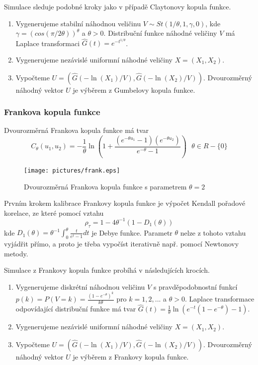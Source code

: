 Simulace sleduje podobné kroky jako v případě Claytonovy kopula funkce.
\begin{enumerate}
\item Vygenerujeme stabilní náhodnou veličinu $V \sim St(1 / \theta, 1, \gamma, 0)$, kde $\gamma = (cos(\pi/2\theta))^{\theta}$ a $\theta > 0$. Distribuční funkce náhodné veličiny $V$ má Laplace transformaci $\hat{G}(t) = e^{-t^{1/\theta}}$.
\item Vygenerujeme nezávislé uniformní náhodné veličiny $X = (X_1, X_2)$.
\item Vypočteme $U = \left(\hat{G}(-\ln(X_1)/V), \hat{G}(-\ln(X_2)/V)\right)$. Dvourozměrný náhodný vektor $U$ je výběrem z Gumbelovy kopula funkce.
\end{enumerate}

\subsubsection{Frankova kopula funkce}

Dvourozměrná Frankova kopula funkce má tvar
\begin{equation*}
C_{\theta}(u_1, u_2) = -\frac{1}{\theta}\ln \left(1 + \frac{(e^{-\theta u_1} - 1)(e^{-\theta u_2})}{e^{-\theta} - 1} \right) ~~~ \theta \in R - \{0\}
\end{equation*}

\begin{figure}[htp]
\centering
\texttt{[image: pictures/frank.eps]}
\caption{Dvourozměrná Frankova kopula funkce s parametrem $\theta = 2$}
\end{figure}

Prvním krokem kalibrace Frankovy kopula funkce je výpočet Kendall pořadové korelace, ze které pomocí vztahu
\begin{equation*}
\rho_{\tau} = 1 - 4 \theta ^ {-1}\left(1 - D_1(\theta)\right)
\end{equation*}
kde $D_1(\theta) = \theta ^ {-1} \int_0^{\theta}\frac{t}{e^t - 1}dt$ je Debye funkce. Parametr $\theta$ nelze z tohoto vztahu vyjádřit přímo, a proto je třeba vypočíst iterativně např. pomocí Newtonovy metody.

Simulace z Frankovy kopula funkce probíhá v následujících krocích.
\begin{enumerate}
\item Vygenerujeme diskrétní náhodnou veličinu $V$ s pravděpodobnostní funkcí $p(k) = P(V = k) = \frac{(1 - e^{-\theta})^k}{k \theta}$ pro $k = 1, 2, ...$  a $\theta > 0$. Laplace transformace odpovídající distribuční funkce má tvar $\hat{G}(t) = \frac{1}{\theta} \ln \left(e^{-t}(1 - e^{-\theta}) - 1\right)$.
\item Vygenerujeme nezávislé uniformní náhodné veličiny $X = (X_1, X_2)$.
\item Vypočteme $U = \left(\hat{G}(-\ln(X_1)/V), \hat{G}(-\ln(X_2)/V)\right)$. Dvourozměrný náhodný vektor $U$ je výběrem z Frankovy kopula funkce.
\end{enumerate}
